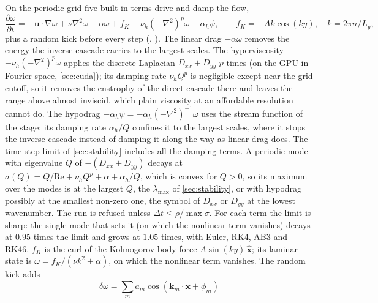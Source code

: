 \documentclass[11pt,a4paper]{article}
\newcommand{\Rey}{\mathrm{Re}}
\newcommand{\code}[1]{\texttt{\detokenize{#1}}}
\begin{document}
On the periodic grid five built-in terms drive and damp the flow,
\begin{equation}
\frac{\partial\omega}{\partial t}=-\mathbf{u}\cdot\nabla\omega+\nu\nabla^2\omega-\alpha\omega+f_K-\nu_h(-\nabla^2)^p\omega-\alpha_h\psi,
\qquad f_K=-Ak\cos(ky),\quad k=2\pi n/L_y,
\end{equation}
plus a random kick before every step (\code{solver_config.forcing}, \code{src/forcing.c}).  The linear drag $-\alpha\omega$ removes the energy the inverse cascade carries to the largest scales.  The hyperviscosity $-\nu_h(-\nabla^2)^p\omega$ applies the discrete Laplacian $D_{xx}+D_{yy}$ $p$ times (on the GPU in Fourier space, \cref{sec:cuda}); its damping rate $\nu_hQ^p$ is negligible except near the grid cutoff, so it removes the enstrophy of the direct cascade there and leaves the range above almost inviscid, which plain viscosity at an affordable resolution cannot do.  The hypodrag $-\alpha_h\psi=-\alpha_h(-\nabla^2)^{-1}\omega$ uses the stream function of the stage; its damping rate $\alpha_h/Q$ confines it to the largest scales, where it stops the inverse cascade instead of damping it along the way as linear drag does.  The time-step limit of \cref{sec:stability} includes all the damping terms.  A periodic mode with eigenvalue $Q$ of $-(D_{xx}+D_{yy})$ decays at $\sigma(Q)=Q/\Rey+\nu_hQ^p+\alpha+\alpha_h/Q$, which is convex for $Q>0$, so its maximum over the modes is at the largest $Q$, the $\lambda_{\max}$ of \cref{sec:stability}, or with hypodrag possibly at the smallest non-zero one, the symbol of $D_{xx}$ or $D_{yy}$ at the lowest wavenumber.  The run is refused unless $\Delta t\le\rho/\max\sigma$.  For each term the limit is sharp: the single mode that sets it (on which the nonlinear term vanishes) decays at $0.95$ times the limit and grows at $1.05$ times, with Euler, RK4, AB3 and RK46.  $f_K$ is the curl of the Kolmogorov body force $A\sin(ky)\,\hat{\mathbf x}$; its laminar state is $\omega=f_K/(\nu k^2+\alpha)$, on which the nonlinear term vanishes.  The random kick adds
\begin{equation}
\delta\omega=\sum_m a_m\cos(\mathbf{k}_m\cdot\mathbf{x}+\phi_m)
\end{equation}
\end{document}
